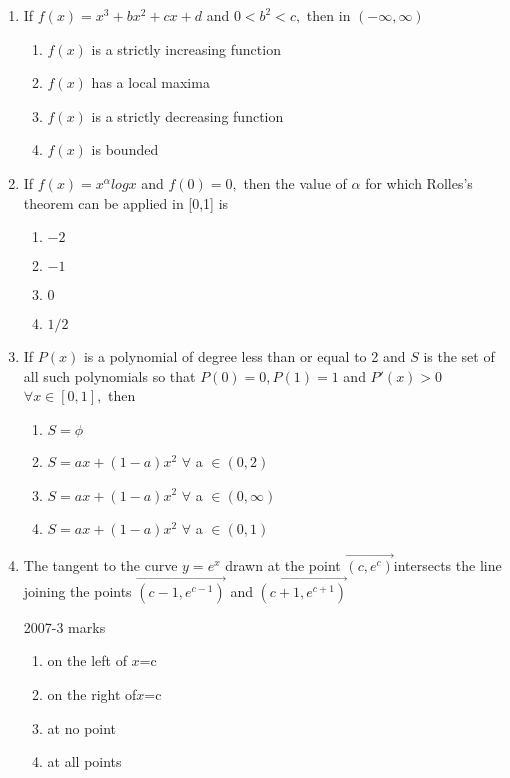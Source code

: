 \documentclass[journal,12pt,twocolumn]{IEEEtran}
\theoremstyle{remark}
\begin{document}
   
    \begin{enumerate} 
        \item If $f(x)=x^3+bx^2+cx+d$ and $0<b^2<c,$ then in $(-\infty,\infty)$ \hfill{}
        \begin{enumerate}
         \item $f(x)$ is a strictly increasing function
         \item $f(x)$ has a local maxima
         \item $f(x)$ is a strictly decreasing function
         \item $f(x)$ is bounded  \\
        \end{enumerate}
    
 
       \item
        If $f(x)=x^{\alpha} logx$ and $f(0)=0,$ then the value of $\alpha$ for which Rolles's theorem can be applied in [0,1] is 
        \hfill{} \\
        \begin {enumerate}
         \item $-2$
         \item $-1$
         \item $0$
         \item $1/2$
        \end{enumerate}
   
    
     \item
     If $P(x)$ is a polynomial of degree less than or equal to 2 and $S$ is the set of all such polynomials so that $P(0)=0,P(1)=1$ and $P'(x)>0$ $\forall x \in [0,1],$ then
     \hfill{} 
    \begin{enumerate}
        \item  $S=\phi$
        \item  $S=ax+(1-a)x^2$ $\forall$ a $\in (0,2)$
        \item  $S=ax+(1-a)x^2$ $\forall$ a $\in (0,\infty)$
        \item  $S=ax+(1-a)x^2$ $\forall$ a $\in (0,1)$ \\
    \end{enumerate} 
    
   
   
      \item 
      The tangent to the curve $y=e^x$ drawn at the point $\vec{(c,e^c)}$intersects the line joining the points $\vec{(c-1,e^{c-1})}$ and $\vec{(c+1,e^{c+1})}$
    
      \hfill {2007-3 marks}\\
      \begin{enumerate}
       \item on the left of $x$=c 
       \item on the right of$x$=c 
       \item at no point  
       \item at all points 
      \end{enumerate}



\end{enumerate}
\end{document}
